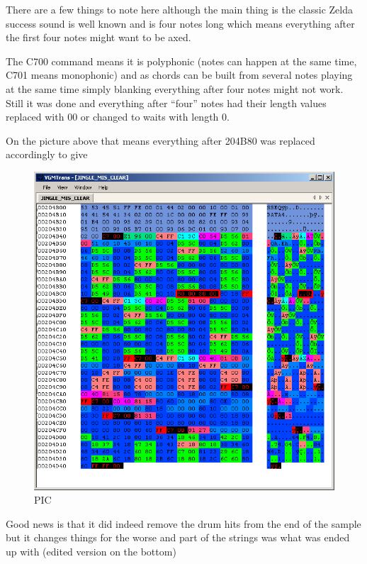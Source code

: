 \documentclass[
]{book}
\begin{document}
There are a few things to note here although the main thing is the classic Zelda success sound is well known and is four notes long which means everything after the first four notes might want to be axed.

The C700 command means it is polyphonic (notes can happen at the same time, C701 means monophonic) and as chords can be built from several notes playing at the same time simply blanking everything after four notes might not work. Still it was done and everything after ``four'' notes had their length values replaced with 00 or changed to waits with length 0.

On the picture above that means everything after 204B80 was replaced accordingly to give

\begin{figure}
\centering
\includegraphics{images/154_home_fast6191_romhackingguide_unrenamed_fil___original_borders_romhackguideSDATSSEQedit_2.png}
\caption{PIC}
\end{figure}

Good news is that it did indeed remove the drum hits from the end of the sample but it changes things for the worse and part of the strings was what was ended up with (edited version on the bottom)
\end{document}
